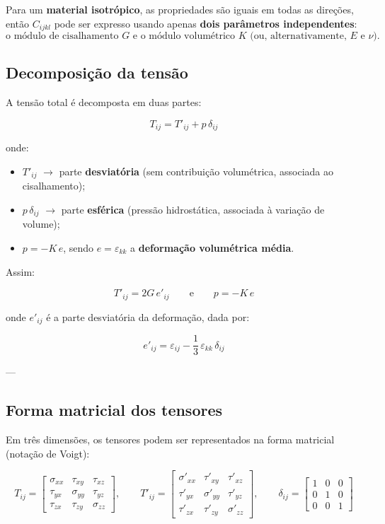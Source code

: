 Para um \textbf{material isotrópico}, as propriedades são iguais em todas as direções, então $C_{ijkl}$ pode ser expresso usando apenas \textbf{dois parâmetros independentes}:
\[
\text{o módulo de cisalhamento } G \text{ e o módulo volumétrico } K \text{ (ou, alternativamente, } E \text{ e } \nu\text{).}
\]

\subsection*{Decomposição da tensão}

A tensão total é decomposta em duas partes:

\[
T_{ij} = T'_{ij} + p\,\delta_{ij}
\]

onde:
\begin{itemize}
    \item $T'_{ij}$ $\rightarrow$ parte \textbf{desviatória} (sem contribuição volumétrica, associada ao cisalhamento);
    \item $p\,\delta_{ij}$ $\rightarrow$ parte \textbf{esférica} (pressão hidrostática, associada à variação de volume);
    \item $p = -K\,e$, sendo $e = \varepsilon_{kk}$ a \textbf{deformação volumétrica média}.
\end{itemize}

Assim:

\[
T'_{ij} = 2G\,e'_{ij}
\qquad \text{e} \qquad
p = -K\,e
\]

onde $e'_{ij}$ é a parte desviatória da deformação, dada por:

\[
e'_{ij} = \varepsilon_{ij} - \frac{1}{3}\,\varepsilon_{kk}\,\delta_{ij}
\]

---

\subsection*{Forma matricial dos tensores}

Em três dimensões, os tensores podem ser representados na forma matricial (notação de Voigt):

\[
T_{ij} =
\begin{bmatrix}
\sigma_{xx} & \tau_{xy} & \tau_{xz} \\
\tau_{yx} & \sigma_{yy} & \tau_{yz} \\
\tau_{zx} & \tau_{zy} & \sigma_{zz}
\end{bmatrix},
\qquad
T'_{ij} =
\begin{bmatrix}
\sigma'_{xx} & \tau'_{xy} & \tau'_{xz} \\
\tau'_{yx} & \sigma'_{yy} & \tau'_{yz} \\
\tau'_{zx} & \tau'_{zy} & \sigma'_{zz}
\end{bmatrix},
\qquad
\delta_{ij} =
\begin{bmatrix}
1 & 0 & 0 \\
0 & 1 & 0 \\
0 & 0 & 1
\end{bmatrix}
\]


